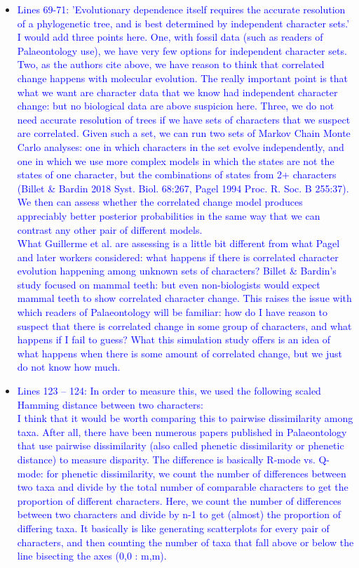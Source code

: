 \documentclass[12pt,letterpaper]{article}
\begin{document}
\begin{itemize}
\item{\textcolor{blue}{Lines 69-71: 'Evolutionary dependence itself requires the accurate resolution of a phylogenetic tree, and is best determined by independent character sets.'
\\
I would add three points here. One, with fossil data (such as readers of Palaeontology use), we have very few options for independent character sets. Two, as the authors cite above, we have reason to think that correlated change happens with molecular evolution. The really important point is that what we want are character data that we know had independent character change: but no biological data are above suspicion here. Three, we do not need accurate resolution of trees if we have sets of characters that we suspect are correlated. Given such a set, we can run two sets of Markov Chain Monte Carlo analyses: one in which characters in the set evolve independently, and one in which we use more complex models in which the states are not the states of one character, but the combinations of states from 2+ characters (Billet \& Bardin 2018 Syst. Biol. 68:267, Pagel 1994 Proc. R. Soc. B 255:37). We then can assess whether the correlated change model produces appreciably better posterior probabilities in the same way that we can contrast any other pair of different models.
\\
What Guillerme et al. are assessing is a little bit different from what Pagel and later workers considered: what happens if there is correlated character evolution happening among unknown sets of characters? Billet \& Bardin’s study focused on mammal teeth: but even non-biologists would expect mammal teeth to show correlated character change. This raises the issue with which readers of Palaeontology will be familiar: how do I have reason to suspect that there is correlated change in some group of characters, and what happens if I fail to guess? What this simulation study offers is an idea of what happens when there is some amount of correlated change, but we just do not know how much.}}


\item{\textcolor{blue}{Lines 123 – 124: In order to measure this, we used the following scaled Hamming distance between two characters:
\\
I think that it would be worth comparing this to pairwise dissimilarity among taxa. After all, there have been numerous papers published in Palaeontology that use pairwise dissimilarity (also called phenetic dissimilarity or phenetic distance) to measure disparity. The difference is basically R-mode vs. Q-mode: for phenetic dissimilarity, we count the number of differences between two taxa and divide by the total number of comparable characters to get the proportion of different characters. Here, we count the number of differences between two characters and divide by n-1 to get (almost) the proportion of differing taxa. It basically is like generating scatterplots for every pair of characters, and then counting the number of taxa that fall above or below the line bisecting the axes (0,0 : m,m).}}


\end{itemize}
\end{document}
